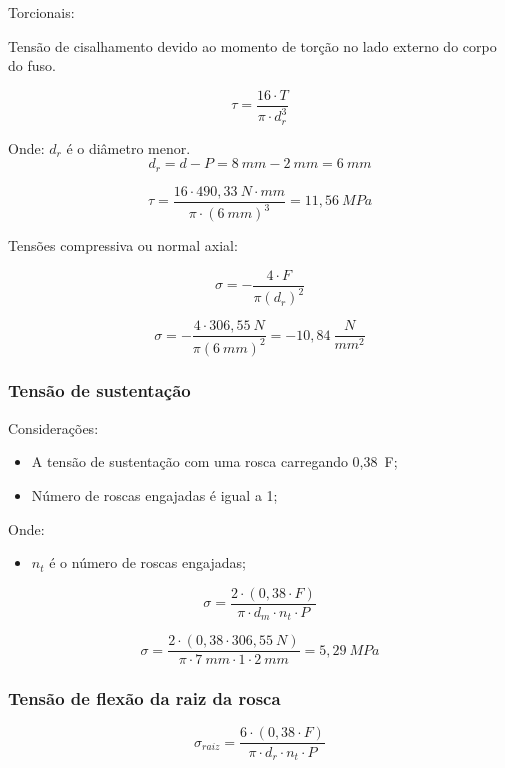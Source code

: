 Torcionais:

Tensão de cisalhamento devido ao momento de torção no lado externo do corpo do fuso.

\begin{equation}\label{eq:tensaocilhamento}
\tau = \frac{16 \cdot T}{\pi \cdot d_{r}^{3}}
\end{equation}

Onde:
$d_{r}$ é o diâmetro menor.
$$d_{r} = d - P = 8~mm - 2~mm = 6~mm$$

$$\tau = \frac{16 \cdot 490,33~N \cdot mm}{\pi \cdot (6~mm)^{3}} = 11,56~MPa$$

Tensões compressiva ou normal axial:

$$\sigma = - \frac{4 \cdot F}{ \pi (d_{r})^{2}}$$

$$\sigma = - \frac{4 \cdot 306,55~N}{ \pi (6~mm)^{2}} = -10,84~\frac{N}{mm^{2}}$$

\subsubsection{Tensão de sustentação}

Considerações:
\begin{itemize}
    \item A tensão de sustentação com uma rosca carregando 0,38~F;
    \item Número de roscas engajadas é igual a 1;
\end{itemize}

Onde:
\begin{itemize}
    \item $n_{t}$ é o número de roscas engajadas;
\end{itemize}

$$\sigma = \frac{2 \cdot (0,38 \cdot F)}{\pi \cdot d_{m} \cdot n_{t} \cdot P}$$

$$\sigma = \frac{2 \cdot (0,38 \cdot 306,55~N)}{\pi \cdot 7~mm \cdot 1 \cdot 2~mm} = 5,29~MPa$$

\subsubsection{Tensão de flexão da raiz da rosca}

\begin{equation}\label{eq:tensaoflexaoraizrosca}
\sigma_{raiz} = \frac{6 \cdot (0,38 \cdot F)}{\pi \cdot d_{r} \cdot n_{t} \cdot P}
\end{equation}

